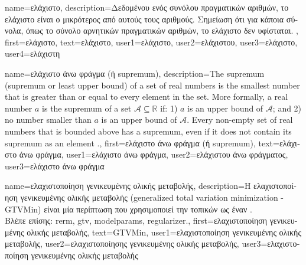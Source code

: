 {name={\foreignlanguage{greek}{ελάχιστο}},
	description={\foreignlanguage{greek}{Δεδομένου ενός συνόλου πραγματικών αριθμών,} 
		\foreignlanguage{greek}{το ελάχιστο είναι ο μικρότερος από αυτούς τους αριθμούς. Σημείωση ότι 
		για κάποια σύνολα, όπως το σύνολο αρνητικών πραγματικών αριθμών, το ελάχιστο δεν υφίσταται.} },
	first={\foreignlanguage{greek}{ελάχιστο}},
	text={\foreignlanguage{greek}{ελάχιστο}},
	user1={\foreignlanguage{greek}{ελάχιστο}}, %
	user2={\foreignlanguage{greek}{ελάχιστου}}, %
	user3={\foreignlanguage{greek}{ελάχιστο}}, %
	user4={\foreignlanguage{greek}{ελάχιστη}} %
}

{name={\foreignlanguage{greek}{ελάχιστο άνω φράγμα (ή} supremum)},
	description={The supremum 
		(supremum or least upper bound) of a set of real numbers is 
		the smallest number that is greater than or equal to every element in the set. More formally, a 
		real number $a$ is the supremum of a set $\mathcal{A} \subseteq \mathbb{R}$ if: 1) $a$ 
		is an upper bound of $\mathcal{A}$; and 2) no number smaller than $a$ is an upper bound of $\mathcal{A}$. 
		Every non-empty set of real numbers that is bounded above has a supremum, even if it does 
		not contain its supremum as an element \cite[Sec.~1.4]{RudinBookPrinciplesMatheAnalysis}.},
	first={\foreignlanguage{greek}{ελάχιστο άνω φράγμα (ή} supremum)},
	text={\foreignlanguage{greek}{ελάχιστο άνω φράγμα}},
	user1={\foreignlanguage{greek}{ελάχιστο άνω φράγμα}}, %
    	user2={\foreignlanguage{greek}{ελάχιστου άνω φράγματος}}, %
    	user3={\foreignlanguage{greek}{ελάχιστο άνω φράγμα}} %
}

{name={\foreignlanguage{greek}{ελαχιστοποίηση γενικευμένης ολικής μεταβολής}},
	description={\foreignlanguage{greek}{Η ελαχιστοποίηση γενικευμένης ολικής 
		μεταβολής} 
		(generalized total variation minimization - GTVMin) \foreignlanguage{greek}{είναι μία περίπτωση} 
		 \foreignlanguage{greek}{που χρησιμοποιεί την}  
		\foreignlanguage{greek}{τοπικών}  
		\foreignlanguage{greek}{ως έναν}  \cite{ClusteredFLTVMinTSP}.\\
		\foreignlanguage{greek}{Βλέπε επίσης:} \gls{rerm}, \gls{gtv}, \gls{modelparams}, \gls{regularizer}.},
	first={\foreignlanguage{greek}{ελαχιστοποίηση γενικευμένης ολικής μεταβολής}},
	text={GTVMin},
	user1={\foreignlanguage{greek}{ελαχιστοποίηση γενικευμένης ολικής μεταβολής}}, %
    	user2={\foreignlanguage{greek}{ελαχιστοποίησης γενικευμένης ολικής μεταβολής}}, %
	user3={\foreignlanguage{greek}{ελαχιστοποίηση γενικευμένης ολικής μεταβολής}} %
}

